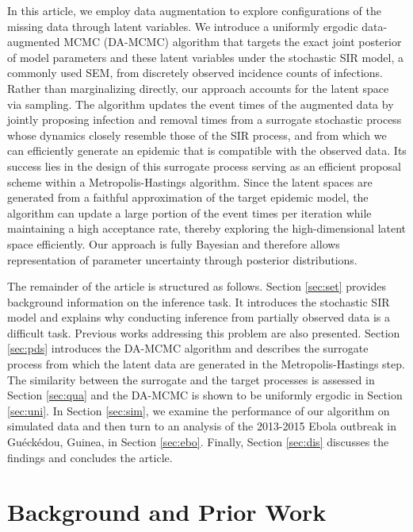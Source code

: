 \documentclass[11pt]{article}
\begin{document}
	In this article, we employ data augmentation to explore configurations of the missing data through latent variables. We introduce a uniformly ergodic data-augmented MCMC (DA-MCMC) algorithm that targets the exact joint posterior of model parameters and these latent variables under the stochastic SIR model, a commonly used SEM, from discretely observed incidence counts of infections. Rather than marginalizing directly, our approach accounts for the latent space via sampling. The algorithm updates the event times of the augmented data by jointly proposing infection and removal times from a surrogate stochastic process whose dynamics closely resemble those of the SIR process, and from which we can efficiently generate an epidemic that is compatible with the observed data. Its success lies in the design of this surrogate process serving as an efficient proposal scheme within a Metropolis-Hastings algorithm. Since the latent spaces are generated from a faithful approximation of the target epidemic model, the algorithm can update a large portion of the event times per iteration while maintaining a high acceptance rate, thereby exploring the high-dimensional latent space efficiently. Our approach is fully Bayesian and therefore allows representation of parameter uncertainty through posterior distributions.
	
	The remainder of the article is structured as follows. Section \eqref{sec:set} provides background information on the inference task. It introduces the stochastic SIR model and explains why conducting inference from partially observed data is a difficult task. Previous works addressing this problem are also presented. Section \eqref{sec:pds} introduces the DA-MCMC algorithm and describes the surrogate process from which the latent data are generated in the Metropolis-Hastings step. The similarity between the surrogate and the target processes is assessed in Section \eqref{sec:qua} and the DA-MCMC is shown to be uniformly ergodic in Section \eqref{sec:uni}. In Section \eqref{sec:sim}, we examine the performance of our algorithm on simulated data and then turn to an analysis of the 2013-2015 Ebola outbreak in Gu\'eck\'edou, Guinea, in Section \eqref{sec:ebo}. Finally, Section \eqref{sec:dis} discusses the findings and concludes the article.
	
	\section{Background and Prior Work}
	\label{sec:set}
	
\end{document}
